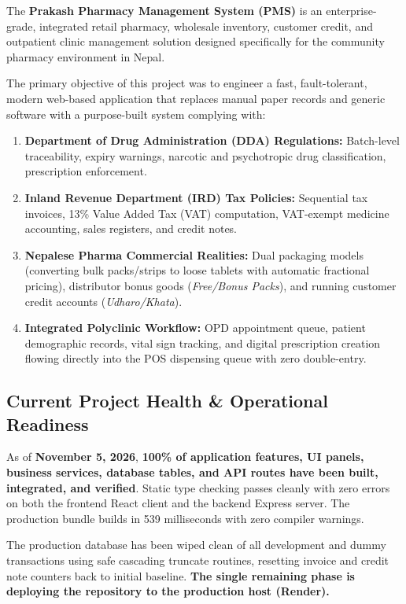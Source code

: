 \documentclass[10pt,a4paper]{article}
\begin{document}
The \textbf{Prakash Pharmacy Management System (PMS)} is an enterprise-grade, integrated retail pharmacy, wholesale inventory, customer credit, and outpatient clinic management solution designed specifically for the community pharmacy environment in Nepal.

The primary objective of this project was to engineer a fast, fault-tolerant, modern web-based application that replaces manual paper records and generic software with a purpose-built system complying with:
\begin{enumerate}
    \item \textbf{Department of Drug Administration (DDA) Regulations:} Batch-level traceability, expiry warnings, narcotic and psychotropic drug classification, prescription enforcement.
    \item \textbf{Inland Revenue Department (IRD) Tax Policies:} Sequential tax invoices, 13\% Value Added Tax (VAT) computation, VAT-exempt medicine accounting, sales registers, and credit notes.
    \item \textbf{Nepalese Pharma Commercial Realities:} Dual packaging models (converting bulk packs/strips to loose tablets with automatic fractional pricing), distributor bonus goods (\textit{Free/Bonus Packs}), and running customer credit accounts (\textit{Udharo/Khata}).
    \item \textbf{Integrated Polyclinic Workflow:} OPD appointment queue, patient demographic records, vital sign tracking, and digital prescription creation flowing directly into the POS dispensing queue with zero double-entry.
\end{enumerate}

\subsection{Current Project Health \& Operational Readiness}
As of \textbf{November 5, 2026}, \textbf{100\% of application features, UI panels, business services, database tables, and API routes have been built, integrated, and verified}. Static type checking passes cleanly with zero errors on both the frontend React client and the backend Express server. The production bundle builds in 539 milliseconds with zero compiler warnings.

The production database has been wiped clean of all development and dummy transactions using safe cascading truncate routines, resetting invoice and credit note counters back to initial baseline. \textbf{The single remaining phase is deploying the repository to the production host (Render).}
\end{document}
